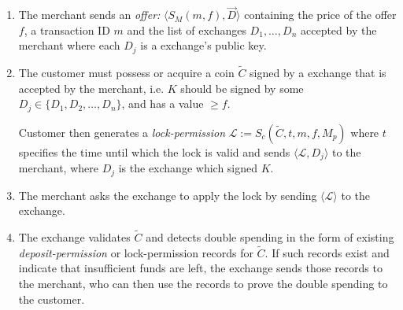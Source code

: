 \documentclass{llncs}
\begin{document}
\begin{enumerate}
\item\label{offer2} The merchant sends an \emph{offer:} $\langle S_M(m, f),
  \vec{D} \rangle$ containing the price of the offer $f$, a transaction
  ID $m$ and the list of exchanges $D_1, \ldots, D_n$ accepted by the merchant
  where each $D_j$ is a exchange's public key.
\item\label{lock2} The customer must possess or acquire a coin $\widetilde{C}$
  signed by a exchange that is
  accepted by the merchant, i.e. $K$ should be signed by some $D_j
  \in \{D_1, D_2, \ldots, D_n\}$, and has a value $\geq f$.

  Customer then generates a \emph{lock-permission} $\mathcal{L} :=
  S_c(\widetilde{C}, t, m, f, M_p)$ where $t$ specifies the time until which the
  lock is valid and sends $\langle \mathcal{L}, D_j\rangle$ to the merchant,
  where $D_j$ is the exchange which signed $K$.
\item The merchant asks the exchange to apply the lock by sending $\langle
  \mathcal{L} \rangle$ to the exchange.
\item The exchange validates $\widetilde{C}$ and detects double spending
  in the form of existing \emph{deposit-permission} or
  lock-permission records for $\widetilde{C}$.  If such records exist
  and indicate that insufficient funds are left, the exchange sends those
  records to the merchant, who can then use the records to prove the double
  spending to the customer.


\end{enumerate}
\end{document}
